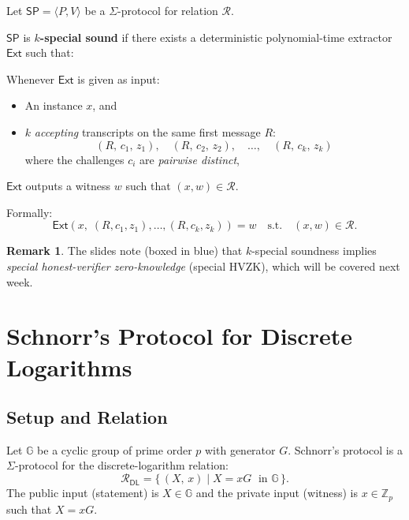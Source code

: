 \documentclass[11pt]{article}
\theoremstyle{plain}
\theoremstyle{definition}
\newtheorem{remark}[theorem]{Remark}
\newcommand{\Zp}{\mathbb{Z}_p}
\begin{document}
\begin{tcolorbox}[colback=green!5!white, colframe=green!60!black,
                  title={Definition: $k$-Special Soundness ($k$-SS)}]
Let $\mathsf{SP} = \langle P, V \rangle$ be a $\Sigma$-protocol for relation $\mathcal{R}$.

$\mathsf{SP}$ is \textbf{$k$-special sound} if there exists a deterministic polynomial-time extractor $\mathsf{Ext}$ such that:

Whenever $\mathsf{Ext}$ is given as input:
\begin{itemize}
  \item An instance $x$, and
  \item $k$ \emph{accepting} transcripts on the same first message $R$:
    \[
      (R,\, c_1,\, z_1),\quad (R,\, c_2,\, z_2),\quad \ldots,\quad (R,\, c_k,\, z_k)
    \]
    where the challenges $c_i$ are \emph{pairwise distinct},
\end{itemize}
$\mathsf{Ext}$ outputs a witness $w$ such that $(x, w) \in \mathcal{R}$.

Formally:
\[
  \mathsf{Ext}\!\left(x,\; (R,c_1,z_1), \ldots, (R,c_k,z_k)\right) = w
  \quad \text{s.t.} \quad (x,w) \in \mathcal{R}.
\]
\end{tcolorbox}

\begin{remark}
The slides note (boxed in blue) that $k$-special soundness implies \emph{special honest-verifier zero-knowledge} (special HVZK), which will be covered next week.
\end{remark}

\section{Schnorr's Protocol for Discrete Logarithms}

\subsection{Setup and Relation}

Let $\mathbb{G}$ be a cyclic group of prime order $p$ with generator $G$. Schnorr's protocol is a $\Sigma$-protocol for the discrete-logarithm relation:
\[
  \mathcal{R}_{\mathsf{DL}} = \bigl\{\,(X,\, x) \;\big|\; X = xG \;\text{ in } \mathbb{G}\,\bigr\}.
\]
The public input (statement) is $X \in \mathbb{G}$ and the private input (witness) is $x \in \Zp$ such that $X = xG$.
\end{document}
